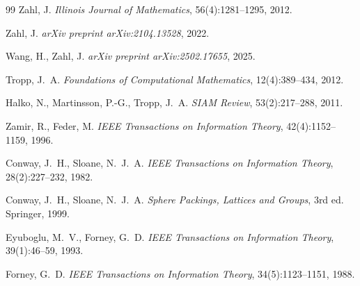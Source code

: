 \documentclass[11pt,a4paper]{article}
\theoremstyle{definition}
\theoremstyle{plain}
\newcommand{\R}{\mathbb{R}}
\begin{document}
\begin{thebibliography}{99}
Zahl, J.
\newblock \emph{Illinois Journal of Mathematics}, 56(4):1281--1295, 2012.

Zahl, J.
\newblock {A new bound on Kakeya sets in $\R^3$.}
\newblock \emph{arXiv preprint arXiv:2104.13528}, 2022.

Wang, H., Zahl, J.
\newblock \emph{arXiv preprint arXiv:2502.17655}, 2025.


Tropp, J.~A.
\newblock \emph{Foundations of Computational Mathematics}, 12(4):389--434, 2012.

Halko, N., Martinsson, P.-G., Tropp, J.~A.
\newblock \emph{SIAM Review}, 53(2):217--288, 2011.


Zamir, R., Feder, M.
\newblock \emph{IEEE Transactions on Information Theory}, 42(4):1152--1159, 1996.

Conway, J.~H., Sloane, N.~J.~A.
\newblock \emph{IEEE Transactions on Information Theory}, 28(2):227--232, 1982.

Conway, J.~H., Sloane, N.~J.~A.
\newblock \emph{Sphere Packings, Lattices and Groups}, 3rd ed.
\newblock Springer, 1999.

Eyuboglu, M.~V., Forney, G.~D.
\newblock \emph{IEEE Transactions on Information Theory}, 39(1):46--59, 1993.

Forney, G.~D.
\newblock \emph{IEEE Transactions on Information Theory}, 34(5):1123--1151, 1988.


\end{thebibliography}
\end{document}
